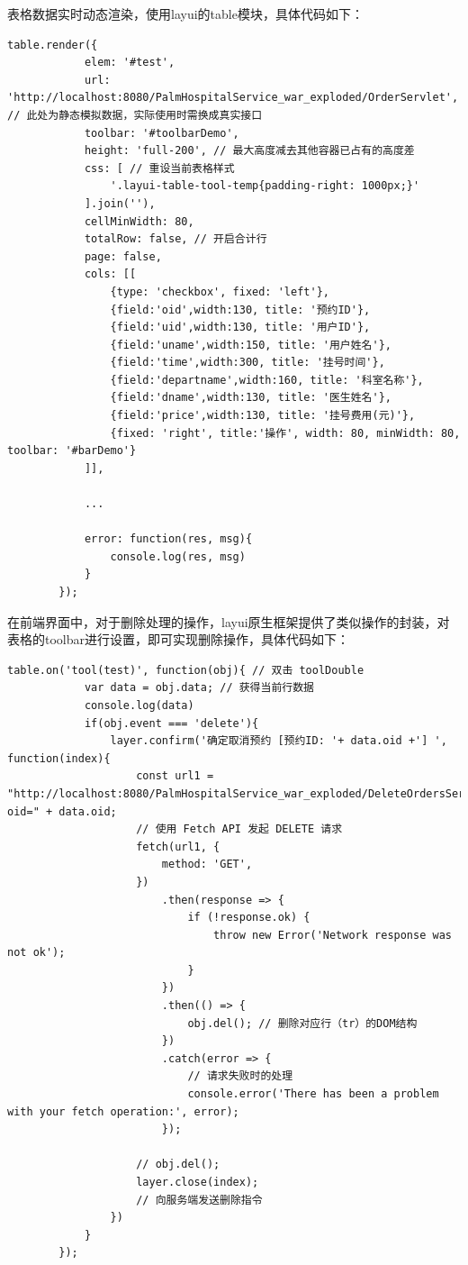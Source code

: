 \documentclass[UTF8,12pt]{article}
\begin{document}
表格数据实时动态渲染，使用layui的table模块，具体代码如下：

\begin{lstlisting}[frame=shadowbox]
    table.render({
            elem: '#test',
            url: 'http://localhost:8080/PalmHospitalService_war_exploded/OrderServlet', // 此处为静态模拟数据，实际使用时需换成真实接口
            toolbar: '#toolbarDemo',
            height: 'full-200', // 最大高度减去其他容器已占有的高度差
            css: [ // 重设当前表格样式
                '.layui-table-tool-temp{padding-right: 1000px;}'
            ].join(''),
            cellMinWidth: 80,
            totalRow: false, // 开启合计行
            page: false,
            cols: [[
                {type: 'checkbox', fixed: 'left'},
                {field:'oid',width:130, title: '预约ID'},
                {field:'uid',width:130, title: '用户ID'},
                {field:'uname',width:150, title: '用户姓名'},
                {field:'time',width:300, title: '挂号时间'},
                {field:'departname',width:160, title: '科室名称'},
                {field:'dname',width:130, title: '医生姓名'},
                {field:'price',width:130, title: '挂号费用(元)'},
                {fixed: 'right', title:'操作', width: 80, minWidth: 80, toolbar: '#barDemo'}
            ]],

            ...

            error: function(res, msg){
                console.log(res, msg)
            }
        });
\end{lstlisting}

在前端界面中，对于删除处理的操作，layui原生框架提供了类似操作的封装，对表格的toolbar进行设置，即可实现删除操作，具体代码如下：

\begin{lstlisting}[frame=shadowbox]
    table.on('tool(test)', function(obj){ // 双击 toolDouble
            var data = obj.data; // 获得当前行数据
            console.log(data)
            if(obj.event === 'delete'){
                layer.confirm('确定取消预约 [预约ID: '+ data.oid +'] ', function(index){
                    const url1 = "http://localhost:8080/PalmHospitalService_war_exploded/DeleteOrdersServlet?oid=" + data.oid;
                    // 使用 Fetch API 发起 DELETE 请求
                    fetch(url1, {
                        method: 'GET',
                    })
                        .then(response => {
                            if (!response.ok) {
                                throw new Error('Network response was not ok');
                            }
                        })
                        .then(() => {
                            obj.del(); // 删除对应行（tr）的DOM结构
                        })
                        .catch(error => {
                            // 请求失败时的处理
                            console.error('There has been a problem with your fetch operation:', error);
                        });

                    // obj.del();
                    layer.close(index);
                    // 向服务端发送删除指令
                })
            }
        });
\end{lstlisting}
\end{document}
